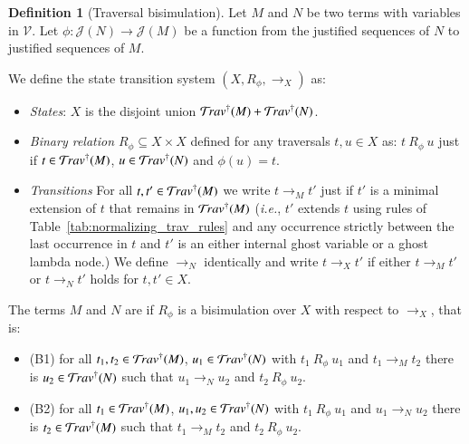\documentclass{elsarticle}
\makeatletter
\theoremstyle{plain}
\theoremstyle{definition}
\newtheorem{definition}{Definition}[section]
\renewcommand\ie{{\it i.e.\@\xspace}}
\def\justseqset{\mathcal{J}}
\makeatother
\begin{document}
\begin{definition}[Traversal bisimulation]
\label{def:bisimilar_terms}
Let $M$ and $N$ be two terms with variables in $\mathcal{V}$. Let $\phi\colon \justseqset(N) \rightarrow\justseqset(M)$ be a function from the justified sequences of $N$ to justified sequences of $M$.

\noindent We define the state transition system $(X, R_\phi, \rightarrow_X)$ as:
\begin{itemize}[nosep]
    \item \emph{States}: $X$ is the disjoint union $\mathcal{T}\!rav^\dagger(M) + \mathcal{T}\!rav^\dagger(N)$.

    \item \emph{Binary relation $R_\phi\subseteq X \times X$} defined for any traversals $t, u \in X$ as:
    $ t~R_\phi~u$ just if $t\in\mathcal{T}\!rav^\dagger(M)$, $u\in\mathcal{T}\!rav^\dagger(N)$ and $\phi(u) = t$.

    \item \emph{Transitions} For all $t, t' \in \mathcal{T}\!rav^\dagger(M)$ we write $t \rightarrow_M t'$ just if $t'$ is a minimal extension of $t$ that remains in $\mathcal{T}\!rav^\dagger(M)$ (\ie, $t'$ extends $t$ using rules of Table~\ref{tab:normalizing_trav_rules} and any occurrence strictly between the last occurrence in $t$ and $t'$ is an either internal ghost variable or a ghost lambda node.) We define $\rightarrow_N$  identically and write $t \rightarrow_X t'$ if either $t \rightarrow_M t'$ or $t \rightarrow_N t'$ holds for $t, t' \in X$.
\end{itemize}

\noindent The terms $M$ and $N$ are  if $R_\phi$ is a bisimulation over $X$ with respect to $\rightarrow_X$, that is:
\begin{itemize}[nosep]
    \item (B1) for all $t_1, t_2 \in \mathcal{T}\!rav^\dagger(M)$, $u_1 \in \mathcal{T}\!rav^\dagger(N)$ with $t_1~R_\phi~u_1$ and $t_1 \rightarrow_M t_2$ there is $u_2 \in \mathcal{T}\!rav^\dagger(N)$ such that $u_1 \rightarrow_N u_2$ and $t_2~R_\phi~u_2$.
    \item (B2) for all $t_1 \in \mathcal{T}\!rav^\dagger(M)$, $u_1, u_2 \in \mathcal{T}\!rav^\dagger(N)$ with $t_1~R_\phi~u_1$ and $u_1 \rightarrow_N u_2$ there is $t_2 \in \mathcal{T}\!rav^\dagger(M)$ such that $t_1 \rightarrow_M t_2$ and $t_2~R_\phi~u_2$.
\end{itemize}
\end{definition}
\end{document}
